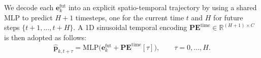 We decode each $\mathbf{e}_k^{\text{fut}}$ into an explicit spatio-temporal trajectory by using a shared MLP to predict $H{+}1$ timesteps, one for the current time $t$ and $H$ for future steps $\{t{+}1,\ldots,t{+}H\}$. A 1D sinusoidal temporal encoding $\mathbf{PE}^{\text{time}}\in\mathbb{R}^{(H+1)\times C}$ is then adopted as follows:
\begin{equation}
\label{eq:track}
\hat{\mathbf{p}}_{k,t+\tau}
= \text{MLP}\big(\mathbf{e}_k^{\text{fut}} + \mathbf{PE}^{\text{time}}[\tau]\big),
\qquad \tau = 0,\ldots,H.
\end{equation}




